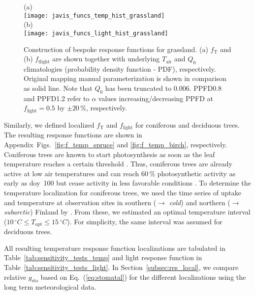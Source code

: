 \documentclass[bg, manuscript]{copernicus}
\begin{document}
\begin{figure}[t]
  \centering
  (a)\\
  \texttt{[image: javis\_funcs\_temp\_hist\_grassland]}\\
  (b)\\
  \texttt{[image: javis\_funcs\_light\_hist\_grassland]}
\caption{Construction of bespoke response functions for grassland. (a) $f_\mathrm{T}$ and (b) $f_\mathrm{flight}$ are shown together with underlying $T_\mathrm{air}$ and $Q_0$ climatologies (probability density function - PDF), respectively. Original mapping manual parameterization is shown in comparison as solid line. Note that $Q_0$ has been truncated to $0.006$. PPFD0.8 and PPFD1.2 refer to $\alpha$ values increasing/decreasing PPFD at $f_\mathrm{light}=0.5$ by $\pm 20\,\%$, respectively.}
\label{fig:f_temp_grassland}
\end{figure}

Similarly, we defined localized $f_\mathrm{T}$ and $f_\mathrm{light}$ for coniferous and deciduous trees. The resulting response functions are shown in Appendix~Figs.~\ref{fig:f_temp_spruce} and \ref{fig:f_temp_birch}, respectively.
Coniferous trees are known to start photosynthesis as soon as the leaf temperature reaches a certain threshold \citep{TB:Kolari2007}. Thus, coniferous trees are already active at low air temperatures and can reach $60\,\unit{\%}$ photosynthetic activity as early as \unit{doy}~100 but cease activity in less favorable conditions \citep{TB:Kolari2007, TP:Wallin2013}. 
To determine the temperature localization for coniferous trees, we used the time series of  uptake and temperature at observation sites in southern ($\rightarrow$ \emph{cold}) and northern ($\rightarrow$ \emph{subarctic}) Finland by \citet{TB:Kolari2007}. From these, we estimated an optimal temperature interval ($10\,\unit{^\circ C}\le T_\mathrm{opt} \le 15\,\unit{^\circ C}$). For simplicity, the same interval was assumed for deciduous trees.

All resulting temperature response function localizations are tabulated in Table~\ref{tab:sensitivity_tests_temp} and light response function in Table~\ref{tab:sensitivity_tests_light}. In Section~\ref{subsec:res_local}, we compare relative $g_\mathrm{sto}$ based on Eq.~(\ref{eq:stomatal}) for the different localizations using the long term meteorological data.
\end{document}
